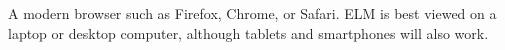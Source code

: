 A modern browser such as Firefox, Chrome, or Safari. ELM is best viewed
on a laptop or desktop computer, although tablets and smartphones will
also work.
